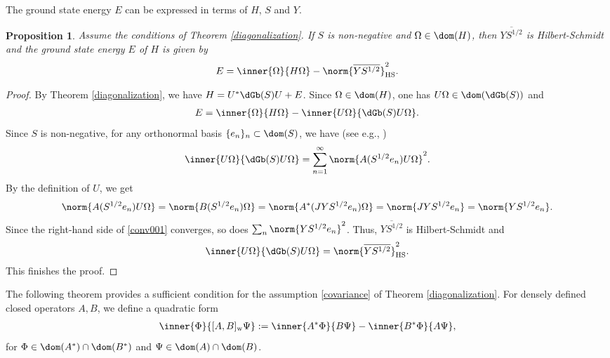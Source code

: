 \documentclass[12pt]{article}
\theoremstyle{plain}
\newtheorem{prop}[theorem]{\bf Proposition}
\numberwithin{equation}{section}
\theoremstyle{remark}
\begin{document}
The ground state energy $E$ can be expressed in terms of $H$, $S$ and $Y$.
\begin{prop}\label{gse1}
Assume the conditions of Theorem \ref{diagonalization}.
If $S$ is non-negative and $\Omega\in\dom(H)$, then $\overline{YS^{1/2}}$ is Hilbert-Schmidt and
the ground state energy $E$ of $H$ is given by 
 \begin{align*}
    E = \inner{\Omega}{H\Omega} - \norm{\overline{YS^{1/2}}}_\mathrm{HS}^2.
 \end{align*}
\end{prop}

\begin{proof}
By Theorem \ref{diagonalization}, we have $H=U^*\dGb(S)U+E$.
Since $\Omega\in\dom(H)$, one has $U\Omega \in\dom(\dGb(S))$ and 
\begin{align*}
 E = \inner{\Omega}{H\Omega} - \inner{U\Omega}{\dGb(S)U\Omega}.
\end{align*}
Since $S$ is non-negative, for any orthonormal basis $\{e_n\}_n\subset \dom(S)$, we have (see e.g., \cite[Theorem 5.21]{A18})
\begin{align}
 \inner{U\Omega}{\dGb(S)U\Omega} 
 = \sum_{n=1}^\infty \norm{A(S^{1/2}e_n)U\Omega}^2. \label{conv001}
\end{align}
By the definition of $U$, we get
\begin{align*}
 \norm{A(S^{1/2}e_n)U\Omega}
= \norm{B(S^{1/2}e_n)\Omega}
 = \norm{A^*(JYS^{1/2}e_n)\Omega}
 = \norm{JYS^{1/2}e_n}
= \norm{YS^{1/2}e_n}.
\end{align*}
Since the right-hand side of \eqref{conv001} converges, so does $\sum_{n}\norm{YS^{1/2}e_n}^2$.
Thus, $\overline{YS^{1/2}}$ is Hilbert-Schmidt and 
\begin{align*}
  \inner{U\Omega}{\dGb(S)U\Omega} = \norm{\overline{YS^{1/2}}}_\mathrm{HS}^2.
\end{align*}
This finishes the proof.
\end{proof}

The following theorem provides a sufficient condition for the assumption \eqref{covariance} of Theorem \ref{diagonalization}.
For densely defined closed operators $A,B$, we define a quadratic form
\begin{align*}
  \inner{\Phi}{[A,B]_\mathrm{w}\Psi}
 := \inner{A^*\Phi}{B\Psi}-\inner{B^*\Phi}{A\Psi}, 
\end{align*}
for $\Phi\in\dom(A^*)\cap \dom(B^*)$ and $\Psi\in\dom(A)\cap\dom(B)$.
\end{document}
